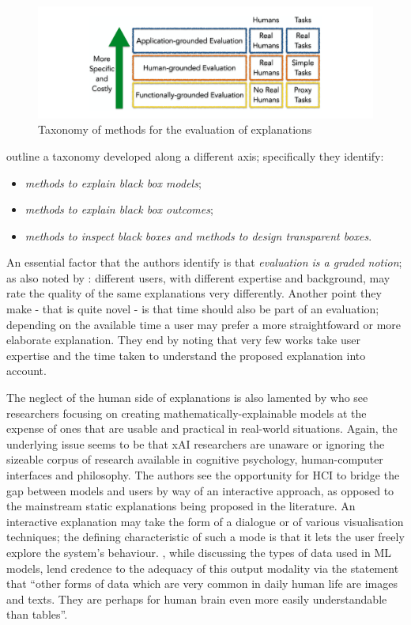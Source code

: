 \begin{figure}[htbp]
\centerline{\includegraphics[width=\textwidth]{literature-review/images/xai-taxonomy}}
\caption{Taxonomy of methods for the evaluation of explanations \citep{doshi2017towards}}
\label{fig:xai-taxonomy}
\end{figure}

\citet{guidotti2018survey} outline a taxonomy developed along a different axis; specifically they identify: 
\begin{itemize}
  \item \textit{methods to explain black box models};
  \item \textit{methods to explain black box outcomes};
  \item \textit{methods to inspect black boxes and methods to design transparent boxes}.
\end{itemize}
An essential factor that the authors identify is that \textit{evaluation is a graded notion}; as also noted by \citet{gilpin2018explaining}: different users, with different expertise and background, may rate the quality of the same explanations very differently.
Another point they make - that is quite novel - is that time should also be part of an evaluation; depending on the available time a user may prefer a more straightfoward or more elaborate explanation.
They end by noting that very few works take user expertise and the time taken to understand the proposed explanation into account.

The neglect of the human side of explanations is also lamented by \citet{abdul2018trends} who see researchers focusing on creating mathematically-explainable models at the expense of ones that are usable and practical in real-world situations.
Again, the underlying issue seems to be that xAI researchers are unaware or ignoring the sizeable corpus of research available in cognitive psychology, human-computer interfaces and philosophy.
The authors see the opportunity for HCI to bridge the gap between models and users by way of an interactive approach, as opposed to the mainstream static explanations being proposed in the literature.
An interactive explanation may take the form of a dialogue or of various visualisation techniques; the defining characteristic of such a mode is that it lets the user freely explore the system's behaviour.
\citet{guidotti2018survey}, while discussing the types of data used in ML models, lend credence to the adequacy of this output modality via the statement that \enquote{other forms of data which are very common in daily human life are images and texts. They are perhaps for human brain even more easily understandable than tables}.

